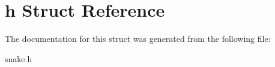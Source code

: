 \hypertarget{structsnake_1_1h}{\section{h Struct Reference}
\label{structsnake_1_1h}
}


The documentation for this struct was generated from the following file\-:\begin{DoxyCompactItemize}
\item 
snake.\-h\end{DoxyCompactItemize}
